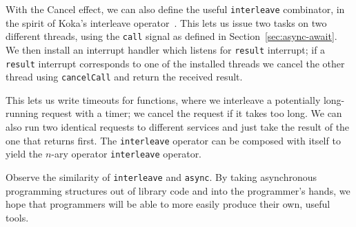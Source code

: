 \documentclass[msc,deptreport,cs]{infthesis} %
\newcommand{\code}[1]{\lstinline{#1}}
\newcommand{\greytext}[1]{\textcolor{black!40}{#1}}
\newcommand{\todo}[1]
           {{\par\noindent\small\color{RoyalPurple}
  \framebox{\parbox{\dimexpr\linewidth-2\fboxsep-2\fboxrule}
    {\textbf{TODO:} #1}}}}
\begin{document}
With the \textsf{Cancel} effect, we can also define the useful \code{interleave}
combinator, in the spirit of Koka's interleave
operator~\cite{leijen2017structured}.
%
This lets us issue two tasks on two different threads, using the \code{call}
signal as defined in Section~\ref{sec:async-await}. We then install an interrupt
handler which listens for \code{result} interrupt; if a \code{result} interrupt
corresponds to one of the installed threads we cancel the other thread using
\code{cancelCall} and return the received result.








This lets us write timeouts for functions, where we interleave a potentially
long-running request with a timer; we cancel the request if it takes too long.
We can also run two identical requests to different services and just take the
result of the one that returns first. The \code{interleave} operator can be
composed with itself to yield the $n$-ary operator \code{interleave} operator.

Observe the similarity of \code{interleave} and \code{async}. By taking
asynchronous programming structures out of library code and into the
programmer's hands, we hope that programmers will be able to more easily produce
their own, useful tools.
\end{document}
